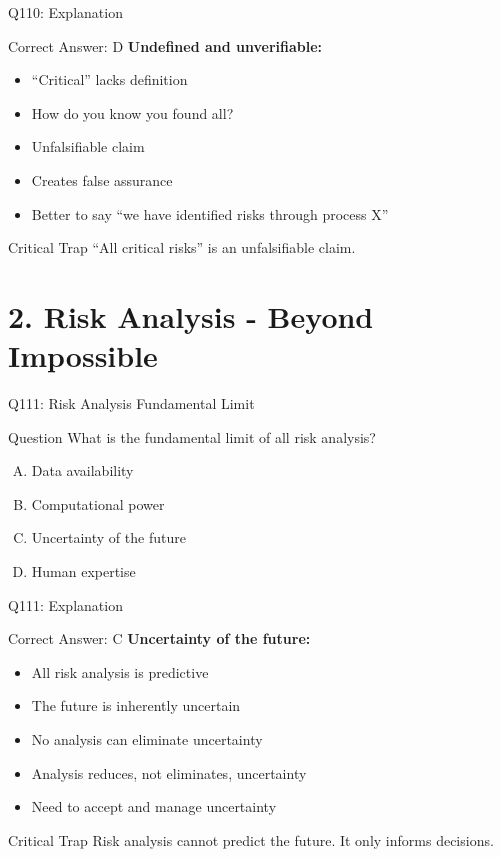 \documentclass{beamer}
\begin{document}
	\begin{frame}{Q110: Explanation}
		\begin{block}{Correct Answer: D}
			\textbf{Undefined and unverifiable:}
			\begin{itemize}
				\item ``Critical'' lacks definition
				\item How do you know you found all?
				\item Unfalsifiable claim
				\item Creates false assurance
				\item Better to say ``we have identified risks through process X''
			\end{itemize}
		\end{block}
		\begin{alertblock}{Critical Trap}
			``All critical risks'' is an unfalsifiable claim.
		\end{alertblock}
	\end{frame}
	
	\section{2. Risk Analysis - Beyond Impossible}
	
	\begin{frame}{Q111: Risk Analysis Fundamental Limit}
		\begin{block}{Question}
			What is the fundamental limit of all risk analysis?
		\end{block}
		\begin{enumerate}[(A)]
			\item Data availability
			\item Computational power
			\item Uncertainty of the future
			\item Human expertise
		\end{enumerate}
	\end{frame}
	
	\begin{frame}{Q111: Explanation}
		\begin{block}{Correct Answer: C}
			\textbf{Uncertainty of the future:}
			\begin{itemize}
				\item All risk analysis is predictive
				\item The future is inherently uncertain
				\item No analysis can eliminate uncertainty
				\item Analysis reduces, not eliminates, uncertainty
				\item Need to accept and manage uncertainty
			\end{itemize}
		\end{block}
		\begin{alertblock}{Critical Trap}
			Risk analysis cannot predict the future. It only informs decisions.
		\end{alertblock}
	\end{frame}
	
\end{document}
